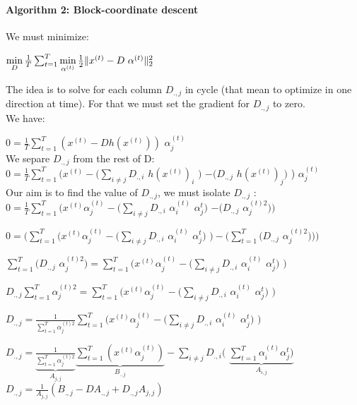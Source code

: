 \documentclass[a4paper,10pt]{article}
\begin{document}
\paragraph{Algorithm 2: Block-coordinate descent}
We must minimize:
\begin{center}
 $\min\limits_{D} \frac{1}{T} \sum_{t=1}^{T}  \min\limits_{\alpha^{(t)}} \frac{1}{2} \| x^{(t)} - D \hspace{3px} \alpha^{(t)} \|_2^2 $\\
\end{center}
The idea is to solve for each column $D_{., j}$ in cycle (that mean to optimize in one direction at time). For that we must set the gradient for $D_{., j}$ to zero.\\
We have:
\begin{center}
 $0 = \frac{1}{T}\sum_{t=1}^{T} (x^{(t)} - D h(x^{(t)}))$ $\alpha^{(t)}_{j}$\\ \vspace{0.4cm}
 We separe $D_{.,j}$ from the rest of D:\\
 $0 = \frac{1}{T}\sum_{t=1}^{T} (x^{(t)} - (\sum_{i \neq j}D_{.,i}$ $h(x^{(t)})_i$ $ )$  $ - (D_{.,j}$ $h(x^{(t)})_j)$ ) $ \alpha^{(t)}_{j}$\\ \vspace{0.4cm}
 Our aim is to find the value of $D_{.,j}$, we must isolate $D_{.,j}$ :\\
 $0 = \frac{1}{T} \sum_{t=1}^{T}(x^{(t)} \alpha^{(t)}_{j} - (\sum_{i \neq j}D_{.,i}$ $\alpha^{(t)}_i$ $\alpha^{t}_{j} )$  $ - (D_{.,j}$ $\alpha^{(t)2}_j))$\\ \vspace{0.2cm}
 
  $0 = (\sum_{t=1}^{T}(x^{(t)} \alpha^{(t)}_{j} - (\sum_{i \neq j}D_{.,i}$ $\alpha^{(t)}_i$ $\alpha^{t}_{j} )$  $) - ( \sum_{t=1}^{T}( D_{.,j}$ $\alpha^{(t)2}_j)))$\\ \vspace{0.2cm}
  
  $  \sum_{t=1}^{T}( D_{.,j}$ $\alpha^{(t)2}_j) = \sum_{t=1}^{T}(x^{(t)} \alpha^{(t)}_{j} - (\sum_{i \neq j}D_{.,i}$ $\alpha^{(t)}_i$ $\alpha^{t}_{j} )$  $) $\\  \vspace{0.2cm}
  
  $ D_{.,j}  \sum_{t=1}^{T} \alpha^{(t)2}_j = \sum_{t=1}^{T}(x^{(t)} \alpha^{(t)}_{j} - (\sum_{i \neq j}D_{.,i}$ $\alpha^{(t)}_i$ $\alpha^{t}_{j} )$  $) $\\ \vspace{0.2cm}
  
$ D_{.,j}  =\frac{1}{ \sum_{t=1}^{T} \alpha^{(t)2}_j} \sum_{t=1}^{T}(x^{(t)} \alpha^{(t)}_{j} - (\sum_{i \neq j}D_{.,i}$ $\alpha^{(t)}_i$ $\alpha^{t}_{j} )$  $) $\\ \vspace{0.2cm}

$ D_{.,j}  =\underbrace{\frac{1}{ \sum_{t=1}^{T} \alpha^{(t)2}_j}}_{A_{j, j}} \underbrace{\sum_{t=1}^{T}(x^{(t)} \alpha^{(t)}_{j})}_{B_{., j}}  - \sum_{i \neq j}D_{., i}($ $\underbrace{\sum_{t=1}^{T} \alpha^{(t)}_i \alpha^{t}_{j} ) }_{A_{i,j}}$\\ \vspace{0.2cm}
$D_{., j} = \frac{1}{A_{j, j}}(B_{., j} - D A_{., j} + D_{., j}A_{j, j})$
\end{center}  
\end{document}
